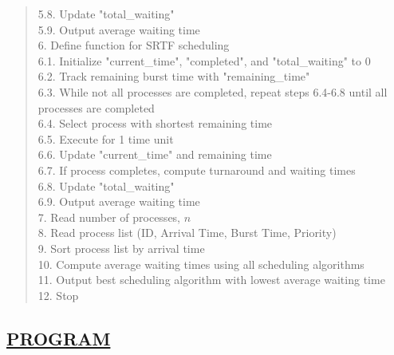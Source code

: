 \documentclass[a4paper, 12pt]{article}
\begin{document}
\begin{quote}
\hspace*{1cm} 5.8. Update "total\_waiting"\\
\hspace*{1cm} 5.9. Output average waiting time\\
6. Define function for SRTF scheduling\\
\hspace*{1cm} 6.1. Initialize "current\_time", "completed", and "total\_waiting" to 0\\
\hspace*{1cm} 6.2. Track remaining burst time with "remaining\_time"\\
\hspace*{1cm} 6.3. While not all processes are completed, repeat steps 6.4-6.8 until all processes are completed\\
\hspace*{1cm} 6.4. Select process with shortest remaining time\\
\hspace*{1cm} 6.5. Execute for 1 time unit\\
\hspace*{1cm} 6.6. Update "current\_time" and remaining time\\
\hspace*{1cm} 6.7. If process completes, compute turnaround and waiting times\\
\hspace*{1cm} 6.8. Update "total\_waiting"\\
\hspace*{1cm} 6.9. Output average waiting time\\
7. Read number of processes, $n$\\
8. Read process list (ID, Arrival Time, Burst Time, Priority)\\
9. Sort process list by arrival time\\
10. Compute average waiting times using all scheduling algorithms\\
11. Output best scheduling algorithm with lowest average waiting time\\
12. Stop\\

\end{quote}

\subsection*{\underline{PROGRAM}}
\begin{quote}
\inputminted[fontsize=\small,breaklines,breakanywhere]{c}{cpu_scheduling.c}%
\end{quote}
\end{document}
